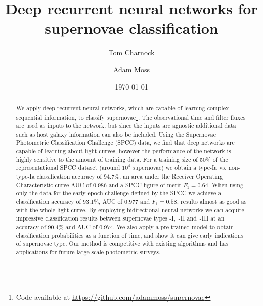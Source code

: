 \documentclass[twocolumn]{aastex61}
\begin{document}
\title{Deep recurrent neural networks for supernovae classification}

\author{Tom Charnock} 

\author{Adam Moss} 

\date{\today}

\begin{abstract}
   We apply deep recurrent neural networks, which are capable of learning complex sequential information, to classify supernovae\footnote{Code available at \href{https://github.com/adammoss/supernovae}{https://github.com/adammoss/supernovae}}. The observational time and filter fluxes are used as inputs to the network, but since the inputs are agnostic additional data such as host galaxy information can also be included. Using the Supernovae Photometric Classification Challenge (SPCC) data, we find that deep networks are capable of learning about light curves, however the performance of the network is highly sensitive to the amount of training data.  For a training size of 50\% of the representational SPCC dataset (around $10^4$ supernovae) we obtain a type-Ia vs. non-type-Ia classification accuracy of 94.7\%, an area under the Receiver Operating Characteristic curve AUC of 0.986 and a SPCC figure-of-merit $F_1=0.64$. When using only the data for the early-epoch challenge defined by the SPCC we achieve a classification accuracy of 93.1\%, AUC of 0.977 and $F_1=0.58$, results almost as good as with the whole light-curve. By employing bidirectional neural networks we can acquire impressive classification results between supernovae types -I,~-II and~-III at an accuracy of 90.4\% and AUC of 0.974. We also apply a pre-trained model to obtain classification probabilities as a function of time, and show it can give early indications of supernovae type. Our method is competitive with existing algorithms and has applications for future large-scale photometric surveys. 
   \end{abstract}

\end{document}
